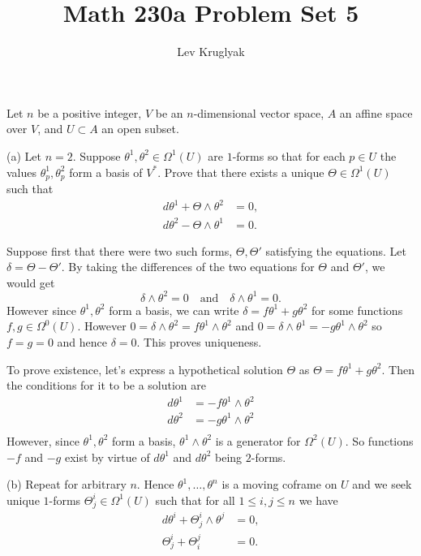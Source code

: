 \documentclass{../../templates/lkx_pset}
\title{Math 230a Problem Set 5}
\author{Lev Kruglyak}
\begin{document}
\maketitle

\begin{problem}{1}
Let $n$ be a positive integer, $V$ be an $n$-dimensional vector space, $A$ an affine space over $V$, and $U\subset A$ an open subset.
\end{problem}

\begin{parts}
	\begin{part}{(a)}
		Let $n=2$. Suppose $\theta^1,\theta^2\in \Omega^1(U)$ are $1$-forms so that for each $p\in U$ the values $\theta^1_p, \theta^2_p$ form a basis of $V^*$. Prove that there exists a unique $\Theta\in \Omega^1(U)$ such that
		\[
			\begin{aligned}
				d\theta^1 + \Theta \wedge \theta^2 & = 0, \\
				d\theta^2 - \Theta \wedge \theta^1 & = 0.
			\end{aligned}
		\]
	\end{part}

	Suppose first that there were two such forms, $\Theta, \Theta'$ satisfying the equations. Let $\delta = \Theta - \Theta'$. By taking the differences of the two equations for $\Theta$ and $\Theta'$, we would get
	\[
		\delta\wedge \theta^2 = 0\quad\textrm{and}\quad\delta\wedge\theta^1 = 0.
	\]
	However since $\theta^1,\theta^2$ form a basis, we can write $\delta = f\theta^1+g\theta^2$ for some functions $f,g\in \Omega^0(U)$. However $0=\delta\wedge \theta^2=f\theta^1\wedge \theta^2$ and $0=\delta\wedge \theta^1=-g\theta^1\wedge \theta^2$ so $f=g=0$ and hence $\delta=0$. This proves uniqueness.

	To prove existence, let's express a hypothetical solution $\Theta$ as $\Theta = f\theta^1+g\theta^2$. Then the conditions for it to be a solution are
	\[
		\begin{aligned}
			d\theta^1 & = -f \theta^1\wedge \theta^2 \\
			d\theta^2 & = -g \theta^1\wedge \theta^2 \\
		\end{aligned}
	\]
	However, since $\theta^1,\theta^2$ form a basis, $\theta^1\wedge \theta^2$ is a generator for $\Omega^2(U)$. So functions $-f$ and $-g$ exist by virtue of $d\theta^1$ and $d\theta^2$ being $2$-forms.

	\begin{part}{(b)}
		Repeat for arbitrary $n$. Hence $\theta^1,\ldots, \theta^n$ is a moving coframe on $U$ and we seek unique $1$-forms $\Theta^i_j\in \Omega^1(U)$ such that for all $1\leq i,j\leq n$ we have
		\[
			\begin{aligned}
				d\theta^i + \Theta^i_j \wedge \theta^j & = 0, \\
				\Theta^i_j+\Theta^j_i                  & = 0.
			\end{aligned}
		\]
	\end{part}


\end{parts}
\end{document}
